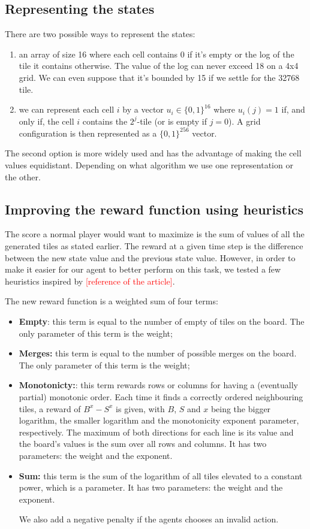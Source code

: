 \documentclass[journal, a4paper]{IEEEtran}
\newcommand\todo[1]{\textcolor{red}{#1}}
\begin{document}
\subsection*{Representing the states} 
There are two possible ways to represent the states:
\begin{enumerate}
    \item an array of size 16 where each cell contains 0 if it's empty or the log of the tile it contains otherwise. The value of the log can never exceed 18 on a 4x4 grid. We can even suppose that it's bounded by 15 if we settle for the 32768 tile.
    \item we can represent each cell $i$ by a vector $u_i \in \{0,1\}^{16}$ where $u_i(j) = 1$ if, and only if, the cell $i$ contains the $2^j$-tile (or is empty if $j = 0$). A grid configuration is then represented as a $\{0,1\}^{256}$ vector.
\end{enumerate}
The second option is more widely used and has the advantage of making the cell values equidistant. Depending on what algorithm we use one representation or the other.

\subsection*{Improving the reward function using heuristics}
The score a normal player would want to maximize is the sum of values of all the generated tiles as stated earlier.
The reward at a given time step is the difference between the new state value and the previous state value.
However, in order to make it easier for our agent to better perform on this task, we tested a few heuristics inspired by \todo{[reference of the article]}. 

The new reward function is a weighted sum of four terms:
\begin{itemize}
    \item \textbf{Empty}: this term is equal to the number of empty of tiles on the board. The only parameter of this term is the weight;
    \item \textbf{Merges:} this term is equal to the number of possible merges on the board. The only parameter of this term is the weight;
    \item \textbf{Monotonicty:}: this term rewards rows or columns for having a (eventually partial) monotonic order. Each time it finds a correctly ordered neighbouring tiles, a reward of $B^x - S^x$ is given, with $B$, $S$ and $x$ being the bigger logarithm, the smaller logarithm and the monotonicity exponent parameter, respectively. The maximum of both directions for each line is its value and the board's values is the sum over all rows and columns. It has two parameters: the weight and the exponent.
    \item \textbf{Sum:} this term is the sum of the logarithm of all tiles elevated to a constant power, which is a parameter. It has two parameters: the weight and the exponent.
    
We also add a negative penalty if the agents chooses an invalid action.

    

\end{itemize}
\end{document}
